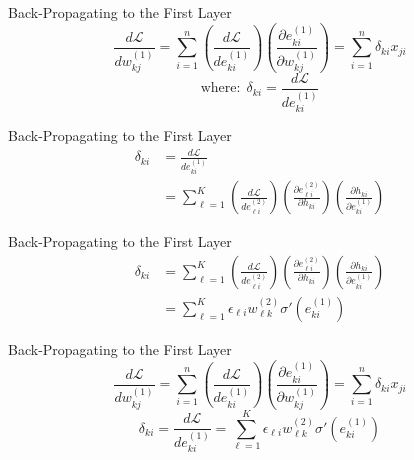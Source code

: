 \documentclass{beamer}
\begin{document}
\begin{frame}
  \begin{small}\end{small}
  \begin{block}{Back-Propagating to the First Layer}    
    \[
    \frac{d{\mathcal L}}{d w_{kj}^{(1)}} =
    \sum_{i=1}^n
    \left(\frac{d{\mathcal L}}{de_{ki}^{(1)}}\right)
    \left(\frac{\partial e_{ki}^{(1)}}{\partial w_{kj}^{(1)}}\right)
    = \sum_{i=1}^n \delta_{ki}x_{ji}
    \]
    \[
    \mbox{where:}~~\delta_{ki}=\frac{d{\mathcal L}}{de_{ki}^{(1)}}
    \]
  \end{block}
\end{frame}

\begin{frame}
  \begin{small}\end{small}
  \begin{block}{Back-Propagating to the First Layer}    
    \begin{align*}
      \delta_{ki} &=\frac{d{\mathcal L}}{de_{ki}^{(1)}}\\
      &= \sum_{\ell=1}^K
      \left(\frac{d{\mathcal L}}{de_{\ell i}^{(2)}}\right)
      \left(\frac{\partial e_{\ell i}^{(2)}}{\partial h_{ki}}\right)
      \left(\frac{\partial h_{ki}}{\partial e_{ki}^{(1)}}\right)
    \end{align*}
  \end{block}
\end{frame}

\begin{frame}
  \begin{small}\end{small}
  \begin{block}{Back-Propagating to the First Layer}    
    \begin{align*}
      \delta_{ki} 
      &= \sum_{\ell=1}^K
      \left(\frac{d{\mathcal L}}{de_{\ell i}^{(2)}}\right)
      \left(\frac{\partial e_{\ell i}^{(2)}}{\partial h_{ki}}\right)
      \left(\frac{\partial h_{ki}}{\partial e_{ki}^{(1)}}\right)\\
      &= \sum_{\ell=1}^K \epsilon_{\ell i}w_{\ell k}^{(2)}\sigma'(e_{ki}^{(1)})
    \end{align*}
  \end{block}
\end{frame}

\begin{frame}
  \begin{small}\end{small}
  \begin{block}{Back-Propagating to the First Layer}    
    \[
    \frac{d{\mathcal L}}{d w_{kj}^{(1)}} =
    \sum_{i=1}^n
    \left(\frac{d{\mathcal L}}{de_{ki}^{(1)}}\right)
    \left(\frac{\partial e_{ki}^{(1)}}{\partial w_{kj}^{(1)}}\right)
    = \sum_{i=1}^n \delta_{ki}x_{ji}
    \]
    \[
    \delta_{ki}=\frac{d{\mathcal L}}{de_{ki}^{(1)}}=
    \sum_{\ell=1}^K \epsilon_{\ell i}w_{\ell k}^{(2)}\sigma'(e_{ki}^{(1)})
    \]
  \end{block}
\end{frame}
\end{document}
